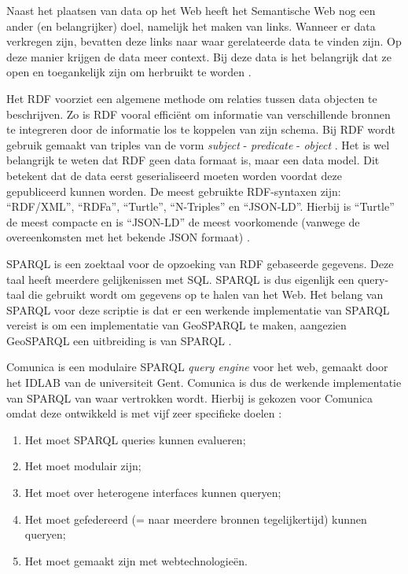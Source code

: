 \documentclass[twocolumn]{phdsymp} %
\begin{document}
Naast het plaatsen van data op het Web heeft het Semantische Web nog een ander (en belangrijker) doel, namelijk het maken van links. Wanneer er data verkregen zijn, bevatten deze links naar waar gerelateerde data te vinden zijn. Op deze manier krijgen de data meer context. Bij deze data is het belangrijk dat ze open en toegankelijk zijn om herbruikt te worden \cite{berners2006linkeddata}.

Het RDF voorziet een algemene methode om relaties tussen data objecten te beschrijven. Zo is RDF vooral efficiënt om informatie van verschillende bronnen te integreren door de informatie los te koppelen van zijn schema. Bij RDF wordt gebruik gemaakt van triples van de vorm \textit{subject} - \textit{predicate} - \textit{object} \cite{lassila1998resource}. Het is wel belangrijk te weten dat RDF geen data formaat is, maar een data model. Dit betekent dat de data eerst geserialiseerd moeten worden voordat deze gepubliceerd kunnen worden. De meest gebruikte RDF-syntaxen zijn: ``RDF/XML'', ``RDFa'', ``Turtle'', ``N-Triples'' en ``JSON-LD''. Hierbij is ``Turtle'' de meest compacte en is ``JSON-LD'' de meest voorkomende (vanwege de overeenkomsten met het bekende JSON formaat) \cite{heath2011linked}.

SPARQL is een zoektaal voor de opzoeking van RDF gebaseerde gegevens. Deze taal heeft meerdere gelijkenissen met SQL. SPARQL is dus eigenlijk een query-taal die gebruikt wordt om gegevens op te halen van het Web. Het belang van SPARQL voor deze scriptie is dat er een werkende implementatie van SPARQL vereist is om een implementatie van GeoSPARQL te maken, aangezien GeoSPARQL een uitbreiding is van SPARQL \cite{sparql2013querylanguage}.

Comunica is een modulaire SPARQL \textit{query engine} voor het web, gemaakt door het IDLAB van de universiteit Gent. Comunica is dus de werkende implementatie van SPARQL van waar vertrokken wordt. Hierbij is gekozen voor Comunica omdat deze ontwikkeld is met vijf zeer specifieke doelen \cite{taelman2018comunica}:
\begin{enumerate}
    \item Het moet SPARQL queries kunnen evalueren;
    \item Het moet modulair zijn;
    \item Het moet over heterogene interfaces kunnen queryen;
    \item Het moet gefedereerd (= naar meerdere bronnen tegelijkertijd) kunnen queryen;
    \item Het moet gemaakt zijn met webtechnologieën.
\end{enumerate}
\end{document}
